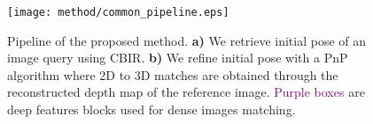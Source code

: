 \begin{figure}
	\centering
	\texttt{[image: method/common\_pipeline.eps]}	
	\caption[Pipeline of our pose refinement method]{\label{fig:pipeline} Pipeline of the proposed method. \textbf{a)} We retrieve initial pose of an image query using CBIR. \textbf{b)} We refine initial pose with a PnP algorithm where 2D to 3D matches are obtained through the reconstructed depth map of the reference image. \textcolor{purple}{Purple boxes} are deep features blocks used for dense images matching.}
\end{figure}
